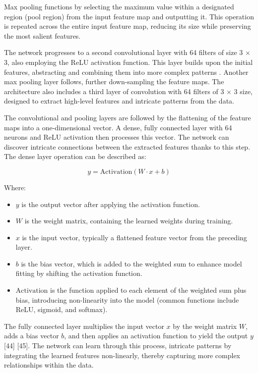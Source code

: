 \documentclass[journal,article,submit,pdftex,moreauthors]{Definitions/mdpi}
\begin{document}
Max pooling functions by selecting the maximum value within a designated region (pool region) from the input feature map and outputting it. This operation is repeated across the entire input feature map, reducing its size while preserving the most salient features.

The network progresses to a second convolutional layer with 64 filters of size 3 × 3, also employing the ReLU activation function. This layer builds upon the initial features, abstracting and combining them into more complex patterns \cite{lecun1998gradient}. Another max pooling layer follows, further down-sampling the feature maps. The architecture also includes a third layer of convolution with 64 filters of 3 × 3 size, designed to extract high-level features and intricate patterns from the data.

The convolutional and pooling layers are followed by the flattening of the feature maps into a one-dimensional vector. A dense, fully connected layer with 64 neurons and ReLU activation \cite{bishop2006pattern} then processes this vector. The network can discover intricate connections between the extracted features thanks to this step. The dense layer operation can be described as:

\begin{equation}
    y = \text{Activation}(W \cdot x + b)
\end{equation}

Where:

\begin{itemize}
  \item \(y\) is the output vector after applying the activation function.
  \item \(W\) is the weight matrix, containing the learned weights during training.
  \item \(x\) is the input vector, typically a flattened feature vector from the preceding layer.
  \item \(b\) is the bias vector, which is added to the weighted sum to enhance model fitting by shifting the activation function.
  \item \(\text{Activation}\) is the function applied to each element of the weighted sum plus bias, introducing non-linearity into the model (common functions include ReLU, sigmoid, and softmax).
\end{itemize}

The fully connected layer multiplies the input vector \(x\) by the weight matrix \(W\), adds a bias vector \(b\), and then applies an activation function to yield the output \(y\) [44] [45]. The network can learn through this process, intricate patterns by integrating the learned features non-linearly, thereby capturing more complex relationships within the data.
\end{document}
